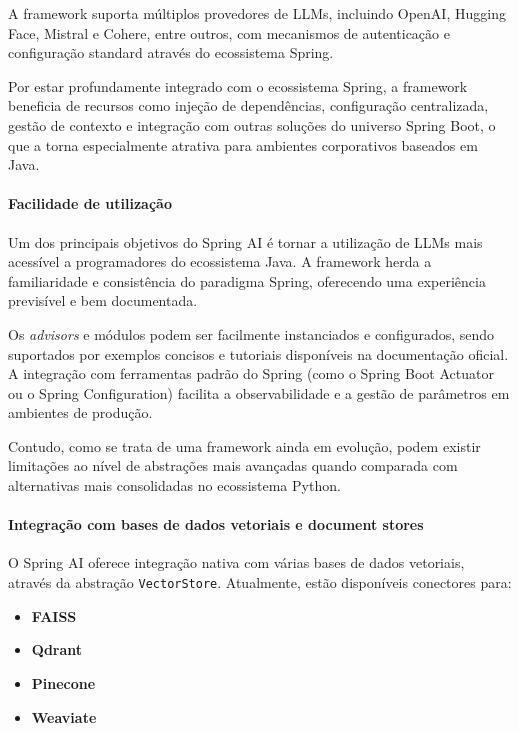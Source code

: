 A framework suporta múltiplos provedores de LLMs, incluindo OpenAI, Hugging Face, Mistral e Cohere, entre outros, com mecanismos de autenticação e configuração standard através do ecossistema Spring.

Por estar profundamente integrado com o ecossistema Spring, a framework beneficia de recursos como injeção de dependências, configuração centralizada, gestão de contexto e integração com outras soluções do universo Spring Boot, o que a torna especialmente atrativa para ambientes corporativos baseados em Java.

\paragraph{Facilidade de utilização}

Um dos principais objetivos do Spring AI é tornar a utilização de LLMs mais acessível a programadores do ecossistema Java. A framework herda a familiaridade e consistência do paradigma Spring, oferecendo uma experiência previsível e bem documentada.

Os \textit{advisors} e módulos podem ser facilmente instanciados e configurados, sendo suportados por exemplos concisos e tutoriais disponíveis na documentação oficial. A integração com ferramentas padrão do Spring (como o Spring Boot Actuator ou o Spring Configuration) facilita a observabilidade e a gestão de parâmetros em ambientes de produção.

Contudo, como se trata de uma framework ainda em evolução, podem existir limitações ao nível de abstrações mais avançadas quando comparada com alternativas mais consolidadas no ecossistema Python.

\paragraph{Integração com bases de dados vetoriais e document stores}

O Spring AI oferece integração nativa com várias bases de dados vetoriais, através da abstração \texttt{VectorStore}. Atualmente, estão disponíveis conectores para:

\begin{itemize} \item \textbf{FAISS} \item \textbf{Qdrant} \item \textbf{Pinecone} \item \textbf{Weaviate} \end{itemize}

